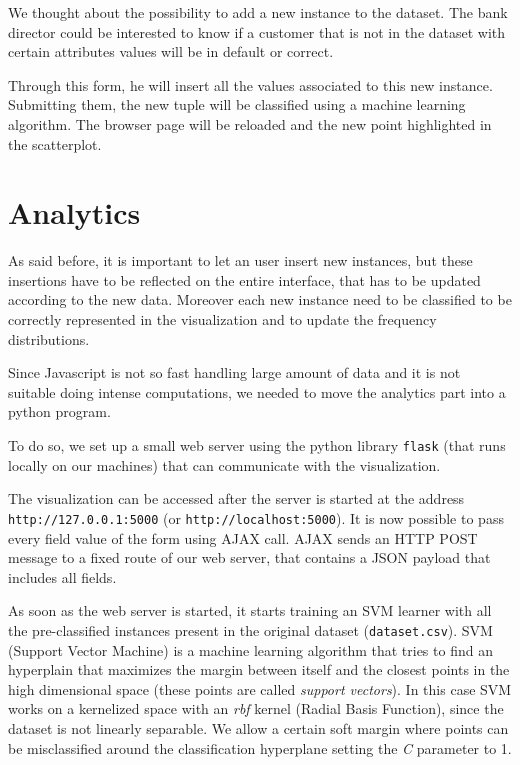 \documentclass[journal]{vgtc}                %
\begin{document}
We thought about the possibility to add a new instance to the dataset. The bank director could be interested to know if a customer that is not in the dataset with certain attributes values
will be in default or correct.

Through this form, he will insert all the values associated to this new instance. Submitting them, the new tuple will be classified
using a machine learning algorithm. The browser page will be reloaded and the new point highlighted in the scatterplot.

\section{Analytics}

As said before, it is important to let an user insert new instances, but these insertions have to be reflected on the entire interface, that has to be updated according to the new data.
Moreover each new instance need to be classified to be correctly represented in the visualization and to update the frequency distributions.

Since Javascript is not so fast handling large amount of data and it is not suitable doing intense computations, we needed to move the analytics part into a python program.

To do so, we set up a small web server using the python library \texttt{flask} (that runs locally on our machines) that can communicate with the visualization.

The visualization can be accessed after the server is started at the address \texttt{http://127.0.0.1:5000} (or \texttt{http://localhost:5000}). It is now possible to pass every field value of the form
using AJAX call. AJAX sends an HTTP POST message to a fixed route of our web server, that contains a JSON payload that includes all fields.

As soon as the web server is started, it starts training an SVM learner with all the pre-classified instances present in the original dataset (\texttt{dataset.csv}).
SVM (Support Vector Machine) \cite{Boser:1992:TAO:130385.130401} is a machine learning algorithm that tries to find an hyperplain that maximizes the margin between itself and the closest points in the high dimensional space (these points are called \textit{support vectors}). In this case
SVM works on a kernelized space with an \textit{rbf} kernel (Radial Basis Function), since the dataset is not linearly separable.
We allow a certain soft margin where points can be misclassified around the classification hyperplane setting the \textit{C} parameter to 1.
\end{document}
